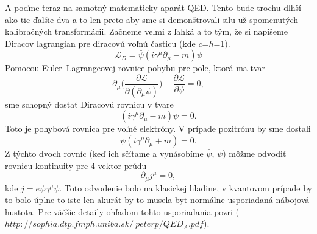 \documentclass[../../main.tex]{subfiles}
\begin{document}
A poďme teraz na samotný matematicky aparát QED. Tento bude trochu dlhší ako tie ďalšie dva a to len preto aby sme si demonštrovali silu už spomenutých kalibračných transformácii. Začneme veľmi z ľahká a to tým, že si napíšeme Diracov lagrangian pre diracovú voľnú časticu (kde $c$=$h$=1).
\begin{equation}
\mathcal{L}_D=\bar{\psi}(i\gamma^{\mu}\partial_{\mu}-m)\psi
\end{equation}
Pomocou Euler–Lagrangeovej rovnice pohybu pre pole, ktorá ma tvar
\begin{equation}
\partial_{\mu}\bigg(\frac{\partial \mathcal{L}}{\partial(\partial_{\mu}\psi)}\bigg)-\frac{\partial\mathcal{L}}{\partial\psi}=0,
\end{equation}
sme schopný dostať Diracovú rovnicu v tvare
\begin{equation}
(i\gamma^{\mu}\partial_{\mu}-m)\psi=0.
\end{equation}
Toto je pohybová rovnica pre voľné elektróny. V prípade pozitrónu by sme dostali
\begin{equation}
\bar{\psi}(i\gamma^{\mu}\partial_{\mu}+m)=0.
\end{equation}
Z týchto dvoch rovníc (keď ich sčítame a vynásobíme $\bar{\psi}$, $\psi$) môžme odvodiť rovnicu kontinuity pre 4-vektor prúdu
\begin{equation}
\partial_{\mu}j^{\mu}=0,
\end{equation}
kde $j=e\bar{\psi}\gamma^{\mu}\psi$.
Toto odvodenie bolo na klasickej hladine, v kvantovom prípade by to bolo úplne to iste len akurát by to musela byt normálne usporiadaná nábojová hustota. Pre väčšie detaily ohľadom tohto usporiadania pozri ($http://sophia.dtp.fmph.uniba.sk/~peterp/QED_A.pdf$).
\end{document}
